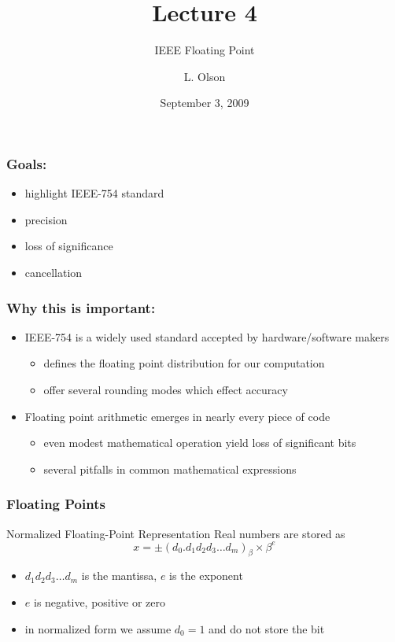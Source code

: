 \documentclass[10pt]{beamer}
\author{L. Olson}
\institute[UIUC]
{Department of Computer Science\\
University of Illinois at Urbana-Champaign\\
\vspace{0.5cm}
}
\title[CS 357]{Lecture 4}
\subtitle{IEEE Floating Point}
\date{September 3, 2009}
\begin{document}
\begin{frame}
  \titlepage
\end{frame}
\begin{frame}
\frametitle{Goals:}
\begin{itemize}
  \item highlight IEEE-754 standard
  \item precision
  \item loss of significance
  \item cancellation
\end{itemize}
\end{frame}
\begin{frame}
\frametitle{Why this is important:}
\begin{itemize} 
  \item IEEE-754 is a widely used standard accepted by hardware/software makers
    \begin{itemize}
      \item defines the floating point distribution for our computation
      \item offer several rounding modes which effect accuracy
    \end{itemize}
  \item Floating point arithmetic emerges in nearly every piece of code
    \begin{itemize}
      \item even modest mathematical operation yield loss of significant bits
      \item several pitfalls in common mathematical expressions
    \end{itemize}
\end{itemize}
\end{frame}
\begin{frame}
\frametitle{Floating Points}
\begin{block}{Normalized Floating-Point Representation}
  Real numbers are stored as
  \begin{equation*}
    x = \pm(d_0.d_1d_2d_3\dots d_m)_{\beta} \times \beta^{e}
\end{equation*}
\end{block}
\begin{itemize}
  \item $d_1d_2d_3\dots d_m$ is the mantissa, $e$ is the exponent
  \item $e$ is negative, positive or zero
  \item in normalized form we assume $d_0 =1$ and do not store the bit
\end{itemize}
\end{frame}
\end{document}
